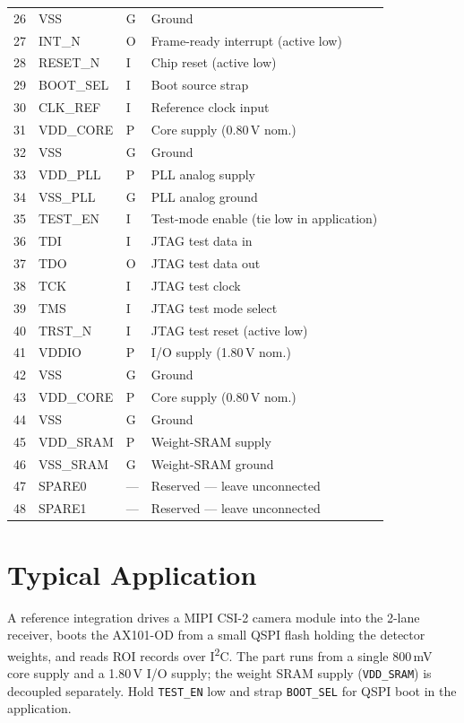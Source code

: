 \documentclass{anvil-datasheet}
\begin{document}
\begin{specbox}
\begin{tabularx}{\textwidth}{@{} l l l X @{}}
26 & VSS & G & Ground \\
27 & INT\_N & O & Frame-ready interrupt (active low) \\
28 & RESET\_N & I & Chip reset (active low) \\
29 & BOOT\_SEL & I & Boot source strap \\
30 & CLK\_REF & I & Reference clock input \\
31 & VDD\_CORE & P & Core supply (0.80\,V nom.) \\
32 & VSS & G & Ground \\
33 & VDD\_PLL & P & PLL analog supply \\
34 & VSS\_PLL & G & PLL analog ground \\
35 & TEST\_EN & I & Test-mode enable (tie low in application) \\
36 & TDI & I & JTAG test data in \\
37 & TDO & O & JTAG test data out \\
38 & TCK & I & JTAG test clock \\
39 & TMS & I & JTAG test mode select \\
40 & TRST\_N & I & JTAG test reset (active low) \\
41 & VDDIO & P & I/O supply (1.80\,V nom.) \\
42 & VSS & G & Ground \\
43 & VDD\_CORE & P & Core supply (0.80\,V nom.) \\
44 & VSS & G & Ground \\
45 & VDD\_SRAM & P & Weight-SRAM supply \\
46 & VSS\_SRAM & G & Weight-SRAM ground \\
47 & SPARE0 & --- & Reserved --- leave unconnected \\
48 & SPARE1 & --- & Reserved --- leave unconnected \\
\bottomrule
\end{tabularx}
\end{specbox}

\section{Typical Application}

A reference integration drives a MIPI CSI-2 camera module into the 2-lane
receiver, boots the AX101-OD from a small QSPI flash holding the detector
weights, and reads ROI records over I\textsuperscript{2}C. The part runs from a
single 800\,mV core supply and a 1.80\,V I/O supply; the weight SRAM supply
(\texttt{VDD\_SRAM}) is decoupled separately. Hold \texttt{TEST\_EN} low and
strap \texttt{BOOT\_SEL} for QSPI boot in the application.
\end{document}
